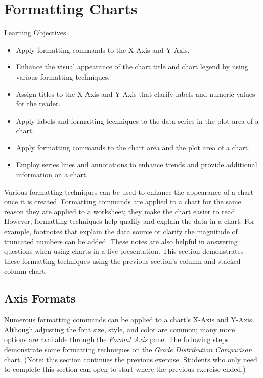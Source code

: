 \section{Formatting Charts}

\begin{center}
	\begin{objbox}{Learning Objectives}
		\begin{itemize}
			\setlength{\itemsep}{0pt}
			\setlength{\parskip}{0pt}
			\setlength{\parsep}{0pt}

			\item Apply formatting commands to the X-Axis and Y-Axis.
			\item Enhance the visual appearance of the chart title and chart legend by using various formatting techniques.
			\item Assign titles to the X-Axis and Y-Axis that clarify labels and numeric values for the reader.
			\item Apply labels and formatting techniques to the data series in the plot area of a chart.
			\item Apply formatting commands to the chart area and the plot area of a chart.
			\item Employ series lines and annotations to enhance trends and provide additional information on a chart.
			
		\end{itemize}
	\end{objbox}
\end{center}

Various formatting techniques can be used to enhance the appearance of a chart once it is created. Formatting commands are applied to a chart for the same reason they are applied to a worksheet; they make the chart easier to read. However, formatting techniques help qualify and explain the data in a chart. For example, footnotes that explain the data source or clarify the magnitude of truncated numbers can be added. These notes are also helpful in answering questions when using charts in a live presentation. This section demonstrates these formatting techniques using the previous section's column and stacked column chart.

\subsection{Axis Formats}

Numerous formatting commands can be applied to a chart's X-Axis and Y-Axis. Although adjusting the font size, style, and color are common; many more options are available through the \textit{Format Axis} pane. The following steps demonstrate some formatting techniques on the \textit{Grade Distribution Comparison} chart. (Note: this section continues the previous exercise. Students who only need to complete this section can open  to start where the previous exercise ended.)

